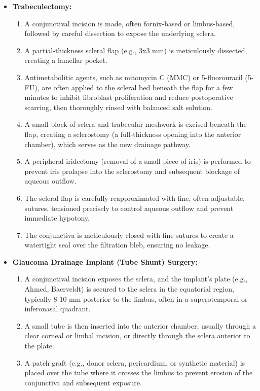 \begin{itemize}
  \item \textbf{Trabeculectomy:}
    \begin{enumerate}
      \item A conjunctival incision is made, often fornix-based or limbus-based, followed by careful dissection to expose the underlying sclera.
      \item A partial-thickness scleral flap (e.g., 3x3 mm) is meticulously dissected, creating a lamellar pocket.
      \item Antimetabolitic agents, such as mitomycin C (MMC) or 5-fluorouracil (5-FU), are often applied to the scleral bed beneath the flap for a few minutes to inhibit fibroblast proliferation and reduce postoperative scarring, then thoroughly rinsed with balanced salt solution.
      \item A small block of sclera and trabecular meshwork is excised beneath the flap, creating a sclerostomy (a full-thickness opening into the anterior chamber), which serves as the new drainage pathway.
      \item A peripheral iridectomy (removal of a small piece of iris) is performed to prevent iris prolapse into the sclerostomy and subsequent blockage of aqueous outflow.
      \item The scleral flap is carefully reapproximated with fine, often adjustable, sutures, tensioned precisely to control aqueous outflow and prevent immediate hypotony.
      \item The conjunctiva is meticulously closed with fine sutures to create a watertight seal over the filtration bleb, ensuring no leakage.
    \end{enumerate}
  \item \textbf{Glaucoma Drainage Implant (Tube Shunt) Surgery:}
    \begin{enumerate}
      \item A conjunctival incision exposes the sclera, and the implant's plate (e.g., Ahmed, Baerveldt) is secured to the sclera in the equatorial region, typically 8-10 mm posterior to the limbus, often in a superotemporal or inferonasal quadrant.
      \item A small tube is then inserted into the anterior chamber, usually through a clear corneal or limbal incision, or directly through the sclera anterior to the plate.
      \item A patch graft (e.g., donor sclera, pericardium, or synthetic material) is placed over the tube where it crosses the limbus to prevent erosion of the conjunctiva and subsequent exposure.

\end{enumerate}
\end{itemize}
